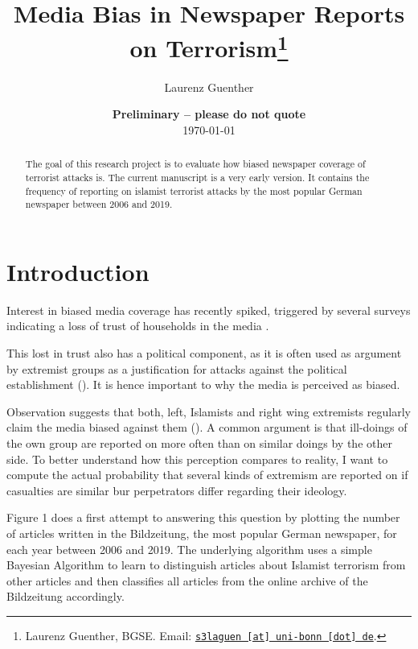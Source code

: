 \documentclass[11pt, a4paper, leqno]{article}
\begin{document}
	
	\title{Media Bias in Newspaper Reports on Terrorism\thanks{Laurenz Guenther, BGSE. Email: \href{mailto:s3laguen@uni-bonn.de}{\nolinkurl{s3laguen [at] uni-bonn [dot] de}}.}}
	
	\author{Laurenz Guenther}
	
	\date{
		{\bf Preliminary -- please do not quote} 
		\\[1ex] 
		\today
	}
	
	\maketitle
	
	
	\begin{abstract}
		The goal of this research project is to evaluate how biased newspaper coverage of terrorist attacks is. The current manuscript is a very early version. It contains the frequency of reporting on islamist terrorist attacks by the most popular German newspaper between 2006 and 2019. 
	\end{abstract}
	\clearpage
	
	\section{Introduction} %
	\label{sec:introduction}



Interest in biased media coverage has recently spiked, triggered by several surveys indicating a loss of trust of households in the media \cite{puglisi2015empirical}. 

This lost in trust also has a political component, as it is often used as argument by extremist groups as a justification for attacks against the political establishment (\cite{schellenberg2016lugenpresse}). It is hence important to why the media is perceived as biased.

Observation suggests that both, left, Islamists and right wing extremists regularly claim the media biased against them (\cite{groseclose2005measure}). A common argument is that ill-doings of the own group are reported on more often than on similar doings by the other side. To better understand how this perception compares to reality, I want to compute the actual probability that several kinds of extremism are reported on if casualties are similar bur perpetrators differ regarding their ideology.



Figure 1 does a first attempt to answering this question by plotting the number of articles written in the Bildzeitung, the most popular German newspaper, for each year between 2006 and 2019. The underlying algorithm uses a simple Bayesian Algorithm to learn to distinguish articles about Islamist terrorism from other articles and then classifies all articles from the online archive of the Bildzeitung accordingly.
\end{document}

